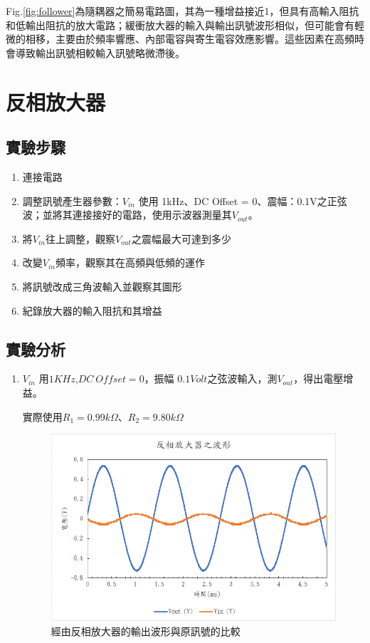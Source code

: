\documentclass[12pt,a4paper]{article}
\begin{document}
\begin{CJK}{UTF8}{bkai}
Fig.\ref{fig:follower}為隨耦器之簡易電路圖，其為一種增益接近1，但具有高輸入阻抗和低輸出阻抗的放大電路；緩衝放大器的輸入與輸出訊號波形相似，但可能會有輕微的相移，主要由於頻率響應、內部電容與寄生電容效應影響。這些因素在高頻時會導致輸出訊號相較輸入訊號略微滯後。


\clearpage

\section{反相放大器}

\subsection{實驗步驟}\label{subsec:step_1}
\begin{enumerate}
    \item 連接電路
    \item 調整訊號產生器參數：$V_{in}$ 使用 1kHz、DC Offset = 0、震幅：0.1V之正弦波；並將其連接接好的電路，使用示波器測量其$V_{out}$。
    \item 將$V_{in}$往上調整，觀察$V_{out}$之震幅最大可達到多少
    \item 改變$V_{in}$頻率，觀察其在高頻與低頻的運作
    \item 將訊號改成三角波輸入並觀察其圖形
    \item 紀錄放大器的輸入阻抗和其增益
\end{enumerate}

\subsection{實驗分析}
\hfill

\begin{enumerate}
    \item $V_{in}$ 用$1KHz$,$DC\ Offset=0$，振幅 $0.1Volt$之弦波輸入，測$V_{out}$，得出電壓增益。

    實際使用$R_1=0.99k\Omega$、$R_2=9.80k\Omega$

\begin{figure}[h]
    \centering
    \includegraphics[width=0.7\linewidth]{figures/ia/Inverting amplifier.png}
    \caption{經由反相放大器的輸出波形與原訊號的比較}
    \label{fig:IA_normal}
\end{figure}


\end{enumerate}
\end{CJK}
\end{document}
